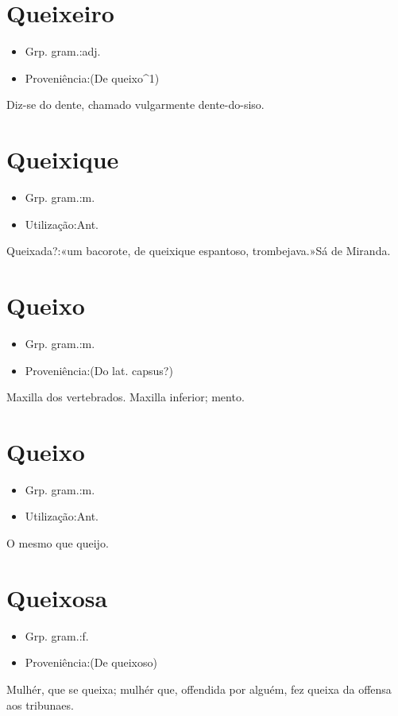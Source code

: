 \section{Queixeiro}
\begin{itemize}
\item {Grp. gram.:adj.}
\end{itemize}
\begin{itemize}
\item {Proveniência:(De \textunderscore queixo\textunderscore ^1)}
\end{itemize}
Diz-se do dente, chamado vulgarmente \textunderscore dente-do-siso\textunderscore .
\section{Queixique}
\begin{itemize}
\item {Grp. gram.:m.}
\end{itemize}
\begin{itemize}
\item {Utilização:Ant.}
\end{itemize}
Queixada?:«\textunderscore um bacorote, de queixique espantoso, trombejava.\textunderscore »Sá de Miranda.
\section{Queixo}
\begin{itemize}
\item {Grp. gram.:m.}
\end{itemize}
\begin{itemize}
\item {Proveniência:(Do lat. \textunderscore capsus\textunderscore ?)}
\end{itemize}
Maxilla dos vertebrados.
Maxilla inferior; mento.
\section{Queixo}
\begin{itemize}
\item {Grp. gram.:m.}
\end{itemize}
\begin{itemize}
\item {Utilização:Ant.}
\end{itemize}
O mesmo que \textunderscore queijo\textunderscore .
\section{Queixosa}
\begin{itemize}
\item {Grp. gram.:f.}
\end{itemize}
\begin{itemize}
\item {Proveniência:(De \textunderscore queixoso\textunderscore )}
\end{itemize}
Mulhér, que se queixa; mulhér que, offendida por alguém, fez queixa da offensa aos tribunaes.
